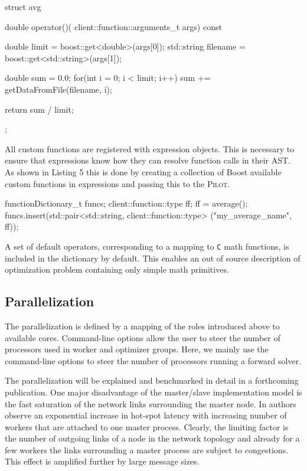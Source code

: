 \documentclass[%
reprint,
amsmath,amssymb,
aps,
]{revtex4-1}
\begin{document}
\begin{code}
struct avg {

    double operator()(
      client::function::arguments_t args) const {

        double limit = boost::get<double>(args[0]);
        std::string filename =
          boost::get<std::string>(args[1]);

        double sum = 0.0;
        for(int i = 0; i < limit; i++)
            sum += getDataFromFile(filename, i);

        return sum / limit;
    }
};
\end{code}

All custom functions are registered with expression objects.
This is necessary to ensure that expressions know how they can resolve
  function calls in their AST.
As shown in Listing 5 this is done by creating a collection of Boost
  available custom functions in expressions and passing this to the
  \textsc{Pilot}.

\begin{code}
functionDictionary_t funcs;
client::function::type ff;
ff = average();
funcs.insert(std::pair<std::string, 
		client::function::type> 
       		("my_average_name", ff));
\end{code}

A set of default operators, corresponding to a mapping to \texttt{C} math
  functions, is included in the dictionary by default.
This enables an out of source description of optimization problem containing
  only simple math primitives.


\subsection{Parallelization} \label{sec:parallelization}

The parallelization is defined by a mapping of the roles introduced above to
  available cores.
Command-line options allow the user to steer the number of processors used in
  worker and optimizer groups.
Here, we mainly use the command-line options to steer the number of processors
  running a forward solver.

The parallelization will be explained and benchmarked in detail in a
  forthcoming publication.
One major disadvantage of the master/slave implementation model is the fast
  saturation of the network links surrounding the master node.
In \cite{bctg:09} authors observe an exponential increase in hot-spot latency
  with increasing number of workers that are attached to one master process.
Clearly, the limiting factor is the number of outgoing links of a node in the
  network topology and already for a few workers the links surrounding a
  master process are subject to congestions.
This effect is amplified further by large message sizes.
\end{document}
